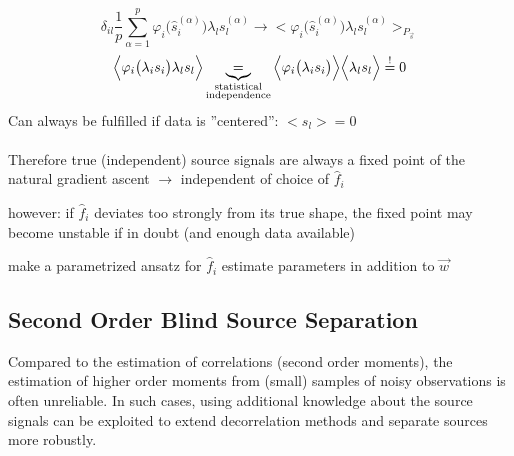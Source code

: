 \begin{equation}
\delta_{il}	\frac{1}{p} \sum\limits_{\alpha = 1}^p \varphi_i \Big(
		\widehat{s}_i^{(\alpha)} \Big) \lambda_l s_l^{(\alpha)}
	\rightarrow \bigg< \varphi_i \Big(
		\widehat{s}_i^{(\alpha)} \Big) \lambda_l s_l^{(\alpha)}
		\bigg>_{P_{\vec{s}}}
\end{equation}
\begin{equation}
	\Big< \varphi_i \big( \lambda_i s_i \big) \lambda_l s_l \Big>
	\underbrace{ = }_{ \substack{ 	\text{statistical} \\
					\text{independence}} }
	\Big< \varphi_i \big( \lambda_i s_i \big) \Big>
	\Big< \lambda_l s_l \Big>
	\stackrel{\mathrm{!}}{=} 0
\end{equation}
Can always be fulfilled if data is ''centered'': $< s_l > = 0$
\\\\
Therefore true (independent) source signals are always a fixed point of the 
natural gradient ascent $\rightarrow$ independent of choice
of $\widehat{f}_i$

\begin{itemize}
	\itR however: if $\widehat{f}_i$ deviates too strongly from its true
		shape, the fixed point may become unstable
	\itR if in doubt (and enough data available)
	\begin{itemize}
		\itl make a parametrized ansatz for $\widehat{f}_i$
		\itl estimate parameters in addition to $\vec{w}$
	\end{itemize}
\end{itemize}

\newpage
\subsection{Second Order Blind Source Separation}


Compared to the estimation of correlations (second order moments), the
estimation of higher order moments from (small) samples of noisy
observations is often unreliable. In such cases, using
additional knowledge about the source signals can be exploited to
extend decorrelation methods and separate sources more robustly.


